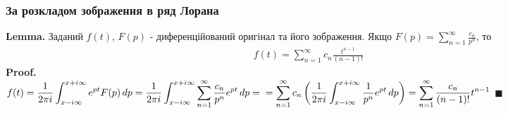 \documentclass[a4paper, 10pt]{article}
\theoremstyle{theoremdd}
\theoremstyle{theoremdd}
\theoremstyle{theoremdd}
\theoremstyle{theoremdd}
\theoremstyle{theoremdd}
\theoremstyle{theoremdd}
\theoremstyle{theoremdd}
\theoremstyle{theoremdd}
\begin{document}
\subsubsection{За розкладом зображення в ряд Лорана}
\textbf{Lemma.} Заданий $f(t)$, $F(p)$ - диференційований оригінал та його зображення. Якщо $\displaystyle F(p) = \sum_{n=1}^{\infty} \frac{c_n}{p^n}$, то
\begin{align*}
f(t) = \sum_{n=1}^{\infty} c_n \frac{t^{n-1}}{(n-1)!}
\end{align*}
\textbf{Proof.}\\
$\displaystyle f(t) = \frac{1}{2 \pi i} \int_{x - i\infty}^{x + i\infty} e^{pt}F(p)\,dp  = \frac{1}{2 \pi i} \int_{x - i\infty}^{x + i\infty} \sum_{n=1}^{\infty} \frac{c_n}{p^n} e^{pt}\,dp = \\ = \sum_{n=1}^{\infty} c_n \left( \frac{1}{2\pi i} \int_{x - i\infty}^{x + i\infty} \frac{1}{p^n} e^{pt}\,dp \right) = \sum_{n=1}^{\infty} \frac{c_n}{(n-1)!}t^{n-1}$ $\blacksquare$\\
\end{document}

